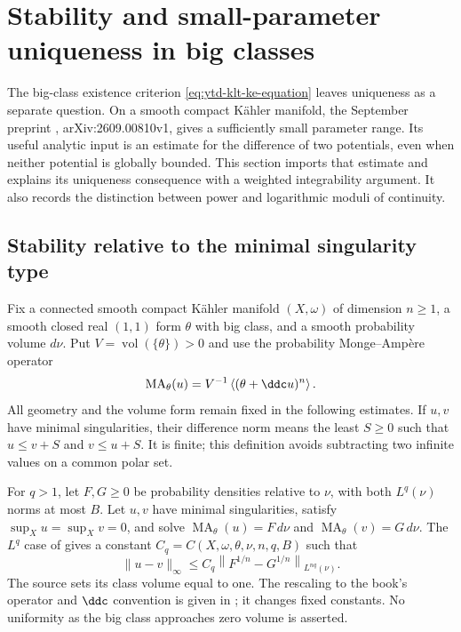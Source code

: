 \section{Stability and small-parameter uniqueness in big classes}
\label{sec:ytd-big-small-uniqueness}

The big-class existence criterion \eqref{eq:ytd-klt-ke-equation}
leaves uniqueness as a separate question. On a smooth compact
K\"ahler manifold, the September preprint
\cite{DangZhangZhou26UniquenessV1}, arXiv:2609.00810v1,
gives a sufficiently small parameter range. Its useful analytic input
is an estimate for the difference of two potentials, even when neither
potential is globally bounded. This section imports that estimate and
explains its uniqueness consequence with a weighted integrability
argument. It also records the distinction between power and logarithmic
moduli of continuity.

\subsection{Stability relative to the minimal singularity type}
\label{sec:ytd-big-density-stability}

Fix a connected smooth compact K\"ahler manifold $(X,\omega)$ of
dimension $n\geq1$, a smooth closed real $(1,1)$ form $\theta$ with
big class, and a smooth probability volume $d\nu$. Put
$V=\operatorname{vol}(\{\theta\})>0$ and use the probability
Monge--Amp\`ere operator
\[
 \operatorname{MA}_\theta(u)
       =V^{-1}\left\langle(\theta+\ddc u)^n\right\rangle.
\]
All geometry and the volume form remain fixed in the following
estimates. If $u,v$ have minimal singularities, their difference norm
means the least $S\geq0$ such that $u\leq v+S$ and $v\leq u+S$.
It is finite; this definition avoids subtracting two infinite values
on a common polar set.

For $q>1$, let $F,G\geq0$ be probability densities relative to
$\nu$, with both $L^q(\nu)$ norms at most $B$.
Let $u,v$ have minimal singularities, satisfy $\sup_Xu=\sup_Xv=0$,
and solve $\operatorname{MA}_\theta(u)=F\,d\nu$ and
$\operatorname{MA}_\theta(v)=G\,d\nu$.
The $L^q$ case of \cite[Theorem~3.2]{DangZhangZhou26UniquenessV1}
gives a constant $C_q=C(X,\omega,\theta,\nu,n,q,B)$ such that
\[
\tag{68.23l}\label{eq:ytd-big-density-stability}
 \|u-v\|_\infty
 \leq C_q\left\|F^{1/n}-G^{1/n}\right\|_{L^{nq}(\nu)}.
\]
The source sets its class volume equal to one. The rescaling to the
book's operator and $\ddc$ convention is given in
; it changes fixed constants.
No uniformity as the big class approaches zero volume is asserted.

